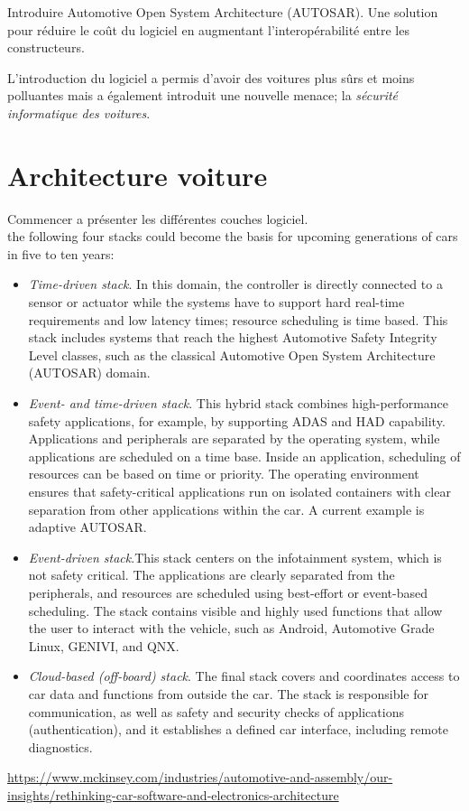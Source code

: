 \begin{tbd}
Introduire Automotive Open System Architecture (AUTOSAR). Une solution pour r\'eduire le co\^ut du logiciel en augmentant l'interop\'erabilit\'e entre les constructeurs.
\end{tbd}


L'introduction du logiciel a permis d'avoir des voitures plus s\^urs et moins polluantes mais a \'egalement introduit une nouvelle menace; la \emph{s\'ecurit\'e informatique des voitures}. 

\section {Architecture voiture}

\begin{tbd}
Commencer a pr\'esenter les diff\'erentes couches logiciel.\\

the following four stacks could become the basis for upcoming generations of cars in five to ten years:
\begin{itemize}

\item \emph{Time-driven stack}. In this domain, the controller is directly connected to a sensor or actuator while the systems have to support hard real-time requirements and low latency times; resource scheduling is time based. This stack includes systems that reach the highest Automotive Safety Integrity Level classes, such as the classical Automotive Open System Architecture (AUTOSAR) domain.
\item \emph{Event- and time-driven stack}. This hybrid stack combines high-performance safety applications, for example, by supporting ADAS and HAD capability. Applications and peripherals are separated by the operating system, while applications are scheduled on a time base. Inside an application, scheduling of resources can be based on time or priority. The operating environment ensures that safety-critical applications run on isolated containers with clear separation from other applications within the car. A current example is adaptive AUTOSAR.
\item \emph{Event-driven stack}.This stack centers on the infotainment system, which is not safety critical. The applications are clearly separated from the peripherals, and resources are scheduled using best-effort or event-based scheduling. The stack contains visible and highly used functions that allow the user to interact with the vehicle, such as Android, Automotive Grade Linux, GENIVI, and QNX.
\item \emph{Cloud-based (off-board) stack}. The final stack covers and coordinates access to car data and functions from outside the car. The stack is responsible for communication, as well as safety and security checks of applications (authentication), and it establishes a defined car interface, including remote diagnostics.
\end{itemize}

\url{https://www.mckinsey.com/industries/automotive-and-assembly/our-insights/rethinking-car-software-and-electronics-architecture}
\end{tbd}


